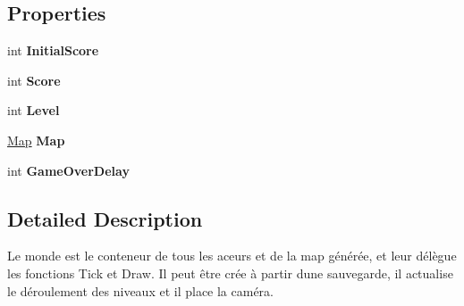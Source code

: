 \subsection*{Properties}
\begin{DoxyCompactItemize}
\item 
\mbox{\label{class_tentacle_slicers_1_1maps_1_1_world_add4b73f014ea74a0bdf0a2b0f3ec27eb}} 
int {\bfseries Initial\+Score}
\item 
\mbox{\label{class_tentacle_slicers_1_1maps_1_1_world_a8a66be56947805cc65749b44b7505bd2}} 
int {\bfseries Score}
\item 
\mbox{\label{class_tentacle_slicers_1_1maps_1_1_world_a8d8c9a48ad57e9aff59251f0c3961cfd}} 
int {\bfseries Level}
\item 
\mbox{\label{class_tentacle_slicers_1_1maps_1_1_world_a8a1b7fe42f7bf83693d332f62c1ae4bc}} 
\hyperlink{class_tentacle_slicers_1_1maps_1_1_map}{Map} {\bfseries Map}
\item 
\mbox{\label{class_tentacle_slicers_1_1maps_1_1_world_a1d71538997d3e715ae420014e18883f9}} 
int {\bfseries Game\+Over\+Delay}
\end{DoxyCompactItemize}


\subsection{Detailed Description}
Le monde est le conteneur de tous les aceurs et de la map générée, et leur délègue les fonctions Tick et Draw. Il peut être crée à partir d\textquotesingle{}une sauvegarde, il actualise le déroulement des niveaux et il place la caméra. 



